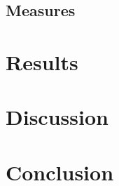 \documentclass[smallextended]{svjour3}
\begin{document}
\subsection{Measures}
\section{Results}
\section{Discussion}
\section{Conclusion}

%

\end{document}
